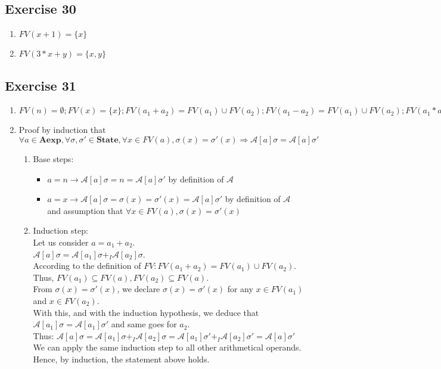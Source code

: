 \documentclass[12pt,fleqn]{article}		%
\begin{document}
\subsection{Exercise 30}
\begin{enumerate}
\item $ FV(x+1) = \{x\} $
\item $ FV(3*x+y) = \{x,y\} $
\end{enumerate}

\subsection{Exercise 31}
\label{sec:ex31}
\begin{enumerate}
\item $ FV(n)=\emptyset; FV(x) = \{x\}; FV(a_1 + a_2) = FV(a_1) \cup FV(a_2); FV(a_1 - a_2) = FV(a_1) \cup FV(a_2); FV(a_1 * a_2) = FV(a_1) \cup FV(a_2) $
\item Proof by induction that\\
$ \forall a \in \textbf{Aexp}, \forall \sigma, \sigma' \in \textbf{State}, \forall x \in FV(a), \sigma(x)=\sigma'(x) \Rightarrow \mathcal{A}[a]\sigma = \mathcal{A}[a]\sigma' $\\
\begin{enumerate}
\item Base steps:
\begin{itemize}
\item $ a = n \rightarrow \mathcal{A}[a]\sigma = n = \mathcal{A}[a]\sigma' $ by definition of $ \mathcal{A} $
\item $ a=x \rightarrow \mathcal{A}[a]\sigma = \sigma(x) = \sigma'(x) = \mathcal{A}[a]\sigma' $ by definition of $ \mathcal{A} $ and assumption that $ \forall x \in FV(a), \sigma(x) = \sigma'(x)$
\end{itemize}
\item Induction step:\\
Let us consider $ a = a_1 + a_2 $.\\
$ \mathcal{A}[a]\sigma = \mathcal{A}[a_1]\sigma +_I \mathcal{A}[a_2]\sigma $.\\
According to the definition of $ FV : FV(a_1 + a_2) = FV(a_1) \cup FV(a_2) $.\\
Thus, $ FV(a_1) \subseteq FV(a), FV(a_2) \subseteq FV(a) $.\\
From $ \sigma(x)=\sigma'(x) $, we declare $ \sigma(x)=\sigma'(x) $ for any $ x \in FV(a_1) $ and $ x \in FV(a_2) $.\\
With this, and with the induction hypothesis, we deduce that $ \mathcal{A}[a_1]\sigma = \mathcal{A}[a_1]\sigma' $ and same goes for $ a_2 $.\\
Thus: $ \mathcal{A}[a]\sigma = \mathcal{A}[a_1]\sigma +_I \mathcal{A}[a_2]\sigma = \mathcal{A}[a_1]\sigma' +_I \mathcal{A}[a_2]\sigma' = \mathcal{A}[a]\sigma' $\\
We can apply the same induction step to all other arithmetical operands.\\
Hence, by induction, the statement above holds.
\end{enumerate}
\end{enumerate}
\end{document}
